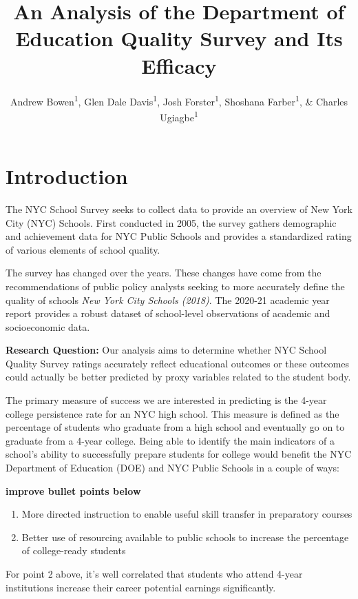 \documentclass[
  man,floatsintext]{apa6}
\title{An Analysis of the Department of Education Quality Survey and Its Efficacy}
\author{Andrew Bowen\textsuperscript{1}, Glen Dale Davis\textsuperscript{1}, Josh Forster\textsuperscript{1}, Shoshana Farber\textsuperscript{1}, \& Charles Ugiagbe\textsuperscript{1}}
\date{}
\affiliation{\vspace{0.5cm}\textsuperscript{1} City University of New York}
\providecommand{\tightlist}{%
  \setlength{\itemsep}{0pt}\setlength{\parskip}{0pt}}
\begin{document}
\maketitle

\hypertarget{introduction}{%
\section{Introduction}\label{introduction}}

The NYC School Survey seeks to collect data to provide an overview of New York City (NYC) Schools. First conducted in 2005, the survey gathers demographic and achievement data for NYC Public Schools and provides a standardized rating of various elements of school quality.

The survey has changed over the years. These changes have come from the recommendations of public policy analysts seeking to more accurately define the quality of schools \emph{New York City Schools (2018)}. The 2020-21 academic year report provides a robust dataset of school-level observations of academic and socioeconomic data.

\textbf{Research Question:} Our analysis aims to determine whether NYC School Quality Survey ratings accurately reflect educational outcomes or these outcomes could actually be better predicted by proxy variables related to the student body.

The primary measure of success we are interested in predicting is the 4-year college persistence rate for an NYC high school. This measure is defined as the percentage of students who graduate from a high school and eventually go on to graduate from a 4-year college. Being able to identify the main indicators of a school's ability to successfully prepare students for college would benefit the NYC Department of Education (DOE) and NYC Public Schools in a couple of ways:

\textbf{improve bullet points below}

\begin{enumerate}
\def\labelenumi{\arabic{enumi}.}
\tightlist
\item
  More directed instruction to enable useful skill transfer in preparatory courses
\item
  Better use of resourcing available to public schools to increase the percentage of college-ready students
\end{enumerate}

For point 2 above, it's well correlated that students who attend 4-year institutions increase their career potential earnings significantly.
\end{document}
